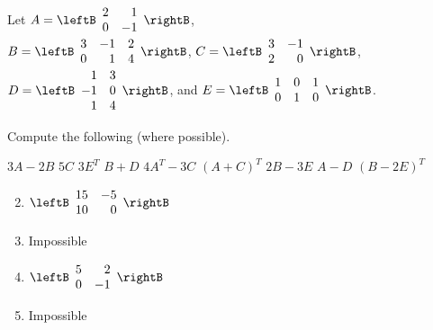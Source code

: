 \begin{multicols}{2}
\begin{ex}
\begin{sol}
\begin{enumerate}[label={\alph*.}]
\end{enumerate}
\end{sol}
\end{ex}

\begin{ex}
Let 
$A = \leftB \begin{array}{rr}
2 & 1 \\
0 & -1
\end{array} \rightB$, \\ $
B = \leftB \begin{array}{rrr}
3 & -1 & 2 \\
0 & 1 & 4
\end{array} \rightB$,  $
C = \leftB \begin{array}{rr}
3 & -1 \\
2 & 0
\end{array} \rightB$, \\ $
D = \leftB \begin{array}{rr}
1 & 3 \\
-1 & 0 \\
1 & 4
\end{array} \rightB$, and  $ 
E = \leftB \begin{array}{rrr}
1 & 0 & 1 \\
0 & 1 & 0
\end{array} \rightB$.

\noindent Compute the following (where possible).
\begin{exenumerate}
\exitem $3A - 2B$
\exitem $5C$
\exitem $3E^{T}$
\exitem $B + D$
\exitem $4A^{T} - 3C$
\exitem $(A + C)^{T}$
\exitem $2B - 3E$
\exitem $A - D$
\exitem $(B - 2E)^{T}$
\end{exenumerate}
\begin{sol}
\begin{enumerate}[label={\alph*.}]
\setcounter{enumi}{1}
\item  
$\leftB \begin{array}{rr}
15 & -5 \\
10 & 0
\end{array} \rightB$
\setcounter{enumi}{3}
\item  Impossible

\setcounter{enumi}{5}
\item  
$\leftB \begin{array}{rr}
5 & 2 \\
0 & -1
\end{array} \rightB$

\setcounter{enumi}{7}
\item  Impossible


\end{enumerate}
\end{sol}
\end{ex}
\end{multicols}
